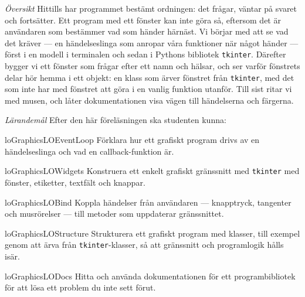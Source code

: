 \emph{Översikt}
Hittills har programmet bestämt ordningen: det frågar, väntar på svaret
och fortsätter.  Ett program med ett fönster kan inte göra så, eftersom
det är användaren som bestämmer vad som händer härnäst.  Vi börjar med
att se vad det kräver --- en händelseslinga som anropar våra funktioner
när något händer --- först i en modell i terminalen och sedan i Pythons
bibliotek \texttt{tkinter}.  Därefter bygger vi ett fönster
som frågar efter ett namn och hälsar, och ser varför fönstrets delar hör
hemma i ett objekt: en klass som ärver fönstret från
\texttt{tkinter}, med det som inte har med fönstret att göra
i en vanlig funktion utanför.  Till sist ritar vi med musen, och låter
dokumentationen visa vägen till händelserna och färgerna.

\emph{Lärandemål}
Efter den här föreläsningen ska studenten kunna:
\begin{restatable}{lo}{GraphicsLOEventLoop}%
  \label{GraphicsLOEventLoop}%
  Förklara hur ett grafiskt program drivs av en händelseslinga och vad en
  \foreignlanguage{english}{callback}-funktion är.
\end{restatable}
\begin{restatable}{lo}{GraphicsLOWidgets}%
  \label{GraphicsLOWidgets}%
  Konstruera ett enkelt grafiskt gränssnitt med
  \texttt{tkinter} med fönster, etiketter, textfält och
  knappar.
\end{restatable}
\begin{restatable}{lo}{GraphicsLOBind}%
  \label{GraphicsLOBind}%
  Koppla händelser från användaren --- knapptryck, tangenter och
  musrörelser --- till metoder som uppdaterar gränssnittet.
\end{restatable}
\begin{restatable}{lo}{GraphicsLOStructure}%
  \label{GraphicsLOStructure}%
  Strukturera ett grafiskt program med klasser, till exempel genom att
  ärva från \texttt{tkinter}-klasser, så att gränssnitt och
  programlogik hålls isär.
\end{restatable}
\begin{restatable}{lo}{GraphicsLODocs}%
  \label{GraphicsLODocs}%
  Hitta och använda dokumentationen för ett programbibliotek för att lösa
  ett problem du inte sett förut.
\end{restatable}

